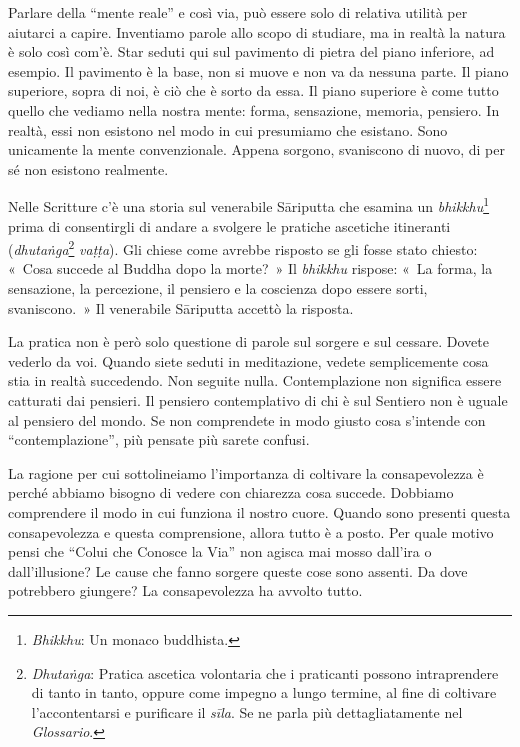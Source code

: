 Parlare della ``mente reale'' e così via, può essere solo di relativa
utilità per aiutarci a capire. Inventiamo parole allo scopo di studiare,
ma in realtà la natura è solo così com'è. Star seduti qui sul pavimento
di pietra del piano inferiore, ad esempio. Il pavimento è la base, non
si muove e non va da nessuna parte. Il piano superiore, sopra di noi, è
ciò che è sorto da essa. Il piano superiore è come tutto quello che
vediamo nella nostra mente: forma, sensazione, memoria, pensiero. In
realtà, essi non esistono nel modo in cui presumiamo che esistano. Sono
unicamente la mente convenzionale. Appena sorgono, svaniscono di nuovo,
di per sé non esistono realmente.

Nelle Scritture c'è una storia sul venerabile Sāriputta che esamina un
\emph{bhikkhu}\footnote{\emph{Bhikkhu}: Un monaco buddhista.} prima di
consentirgli di andare a svolgere le pratiche ascetiche itineranti
(\emph{dhutaṅga}\footnote{\emph{Dhutaṅga}: Pratica ascetica volontaria
  che i praticanti possono intraprendere di tanto in tanto, oppure come
  impegno a lungo termine, al fine di coltivare l'accontentarsi e
  purificare il \emph{sīla}. Se ne parla più dettagliatamente nel
  \emph{Glossario}.} \emph{vaṭṭa}). Gli chiese come avrebbe risposto se
gli fosse stato chiesto: «~Cosa succede al Buddha dopo la morte?~» Il
\emph{bhikkhu} rispose: «~La forma, la sensazione, la percezione, il
pensiero e la coscienza dopo essere sorti, svaniscono.~» Il venerabile
Sāriputta accettò la risposta.

La pratica non è però solo questione di parole sul sorgere e sul
cessare. Dovete vederlo da voi. Quando siete seduti in meditazione,
vedete semplicemente cosa stia in realtà succedendo. Non seguite nulla.
Contemplazione non significa essere catturati dai pensieri. Il pensiero
contemplativo di chi è sul Sentiero non è uguale al pensiero del mondo.
Se non comprendete in modo giusto cosa s'intende con ``contemplazione'',
più pensate più sarete confusi.

La ragione per cui sottolineiamo l'importanza di coltivare la
consapevolezza è perché abbiamo bisogno di vedere con chiarezza cosa
succede. Dobbiamo comprendere il modo in cui funziona il nostro cuore.
Quando sono presenti questa consapevolezza e questa comprensione, allora
tutto è a posto. Per quale motivo pensi che ``Colui che Conosce la Via''
non agisca mai mosso dall'ira o dall'illusione? Le cause che fanno
sorgere queste cose sono assenti. Da dove potrebbero giungere? La
consapevolezza ha avvolto tutto.


